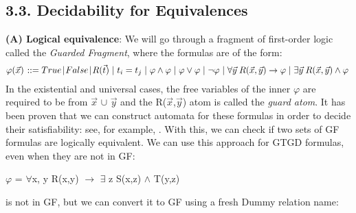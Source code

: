 \documentclass[11pt, a4paper, dvipsnames]{article}
\begin{document}
\subsection{3.3. Decidability for Equivalences}
\textbf{(A) Logical equivalence}:\newline
We will go through a fragment of first-order logic called the \textit{Guarded Fragment}, where the formulas are of the form:
\begin{gather*}
\varphi(\vec{x}) \hspace{0.1em} ::= True \hspace{0.1em} | \hspace{0.1em} False \hspace{0.1em} | \hspace{0.1em} R(\vec{t}) \hspace{0.3em} |\hspace{0.3em} t_{i} = t_{j} \hspace{0.3em}| \hspace{0.3em}\varphi \wedge \varphi \hspace{0.3em}| \hspace{0.3em}\varphi \vee \varphi \hspace{0.3em}| \hspace{0.3em}\neg \varphi \hspace{0.3em}| \hspace{0.3em}\forall \vec{y} \hspace{0.25em} R(\vec{x}, \vec{y}) \rightarrow \varphi \hspace{0.3em}|\hspace{0.3em} \exists \vec{y} \hspace{0.25em} R(\vec{x}, \vec{y}) \wedge \varphi\hspace{0.3em}
\end{gather*}
In the existential and universal cases, the free variables of the inner $\varphi$ are required to be from $\vec{x}$ $\cup$ $\vec{y}$ and the R($\vec{x}$,$\vec{y}$) atom is called the \textit{guard atom}.\newline
It has been proven that we can construct automata for these formulas in order to decide their satisfiability: see, for example, \cite{decidable}. With this, we can check if two sets of GF formulas are logically equivalent. We can use this approach for GTGD formulas, even when they are not in GF:
\begin{center}
$\varphi$ = $\forall$x, y R(x,y) $\rightarrow$ $\exists$ z S(x,z) $\wedge$ T(y,z)
\end{center}
is not in GF, but we can convert it to GF using a fresh Dummy relation name:
\end{document}
